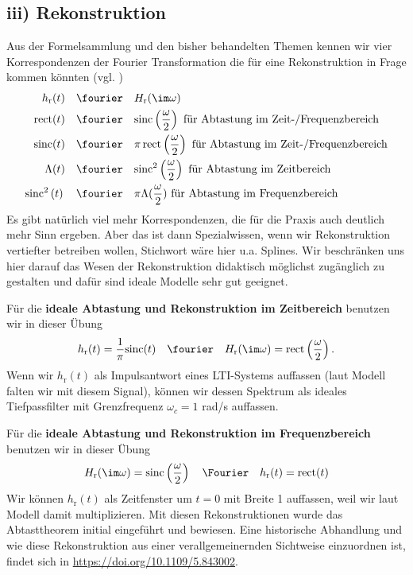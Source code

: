 \subsection*{iii) Rekonstruktion}
Aus der Formelsammlung und den bisher behandelten Themen kennen wir vier
Korrespondenzen der Fourier Transformation die für eine Rekonstruktion
in Frage kommen könnten (vgl. )
\begin{align}
h_\mathrm{r}(t) \quad\fourier\quad  & H_\mathrm{r}(\im\omega)\\
\text{rect}(t) \quad\fourier\quad  &\text{sinc}\left( \frac{\omega}{2} \right)\text{ für Abtastung im Zeit-/Frequenzbereich}\\
\text{sinc}(t)  \quad\fourier\quad  &\pi \,\text{rect}\left(\frac{\omega}{2}\right)\text{ für Abtastung im Zeit-/Frequenzbereich}\\
\Lambda(t) \quad\fourier\quad  &\text{sinc}^2\left( \frac{\omega}{2} \right)  \text{ für Abtastung im Zeitbereich}\\
\text{sinc}^2\left( t \right) \quad\fourier\quad  &\pi\Lambda(\frac{\omega}{2})\text{ für Abtastung im Frequenzbereich}
\end{align}
Es gibt natürlich viel mehr Korrespondenzen, die für die Praxis auch deutlich mehr
Sinn ergeben. Aber das ist dann Spezialwissen, wenn wir
Rekonstruktion vertiefter betreiben wollen, Stichwort wäre hier u.a. Splines.
Wir beschränken uns hier darauf das Wesen der Rekonstruktion didaktisch möglichst
zugänglich zu gestalten und dafür sind ideale Modelle sehr gut geeignet.

Für die \textbf{ideale Abtastung und Rekonstruktion im Zeitbereich} benutzen
wir in dieser Übung
\begin{align}
h_\mathrm{r}(t) = \frac{1}{\pi}\text{sinc}(t)
\quad\fourier\quad
H_\mathrm{r}(\im\omega) = \text{rect}\left(\frac{\omega}{2}\right).
\end{align}
Wenn wir $h_\mathrm{r}(t)$ als Impulsantwort eines LTI-Systems auffassen (laut
Modell falten wir mit diesem Signal), können wir
dessen Spektrum als ideales Tiefpassfilter mit Grenzfrequenz $\omega_c=1$ rad/s auffassen.
%

Für die \textbf{ideale Abtastung und Rekonstruktion im Frequenzbereich} benutzen
wir in dieser Übung
\begin{align}
H_\mathrm{r}(\im\omega) = \text{sinc}\left( \frac{\omega}{2} \right)
\quad\Fourier\quad
h_\mathrm{r}(t)  = \text{rect}(t)
\end{align}
Wir können $h_\mathrm{r}(t)$ als Zeitfenster um $t=0$ mit Breite 1 auffassen,
weil wir laut Modell damit multiplizieren.
Mit diesen Rekonstruktionen wurde das Abtasttheorem initial eingeführt und
bewiesen. Eine historische Abhandlung und wie diese Rekonstruktion
aus einer verallgemeinernden Sichtweise einzuordnen ist, findet sich in
\url{https://doi.org/10.1109/5.843002}.

